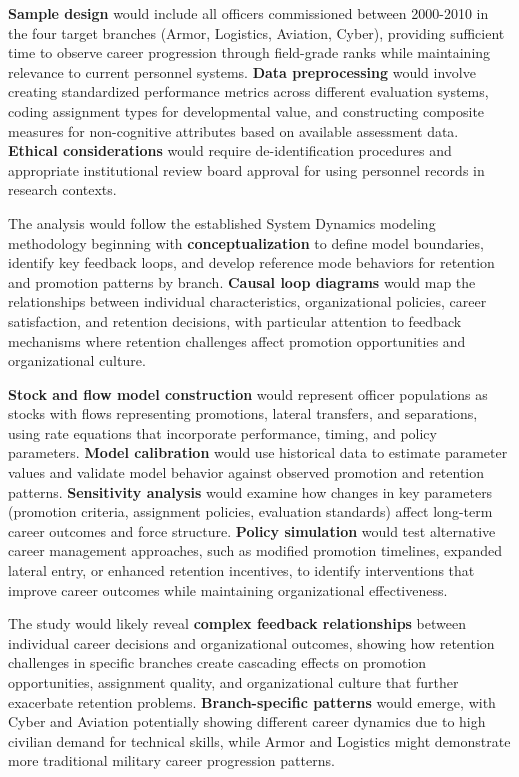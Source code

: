 \documentclass[main.tex]{subfiles}
\begin{document}
\textbf{Sample design} would include all officers commissioned between 2000-2010 in the four target branches (Armor, Logistics, Aviation, Cyber), providing sufficient time to observe career progression through field-grade ranks while maintaining relevance to current personnel systems\parencite{army_indicators}. \textbf{Data preprocessing} would involve creating standardized performance metrics across different evaluation systems, coding assignment types for developmental value, and constructing composite measures for non-cognitive attributes based on available assessment data. \textbf{Ethical considerations} would require de-identification procedures and appropriate institutional review board approval for using personnel records in research contexts.


The analysis would follow the established System Dynamics modeling methodology beginning with \textbf{conceptualization} to define model boundaries, identify key feedback loops, and develop reference mode behaviors for retention and promotion patterns by branch\parencite{building_model}. \textbf{Causal loop diagrams} would map the relationships between individual characteristics, organizational policies, career satisfaction, and retention decisions, with particular attention to feedback mechanisms where retention challenges affect promotion opportunities and organizational culture.

\textbf{Stock and flow model construction} would represent officer populations as stocks with flows representing promotions, lateral transfers, and separations, using rate equations that incorporate performance, timing, and policy parameters\parencite{systems_analysis}. \textbf{Model calibration} would use historical data to estimate parameter values and validate model behavior against observed promotion and retention patterns. \textbf{Sensitivity analysis} would examine how changes in key parameters (promotion criteria, assignment policies, evaluation standards) affect long-term career outcomes and force structure. \textbf{Policy simulation} would test alternative career management approaches, such as modified promotion timelines, expanded lateral entry, or enhanced retention incentives, to identify interventions that improve career outcomes while maintaining organizational effectiveness.


The study would likely reveal \textbf{complex feedback relationships} between individual career decisions and organizational outcomes, showing how retention challenges in specific branches create cascading effects on promotion opportunities, assignment quality, and organizational culture that further exacerbate retention problems\parencite{dulce_thesis}. \textbf{Branch-specific patterns} would emerge, with Cyber and Aviation potentially showing different career dynamics due to high civilian demand for technical skills, while Armor and Logistics might demonstrate more traditional military career progression patterns\parencite{army_indicators}.
\end{document}
